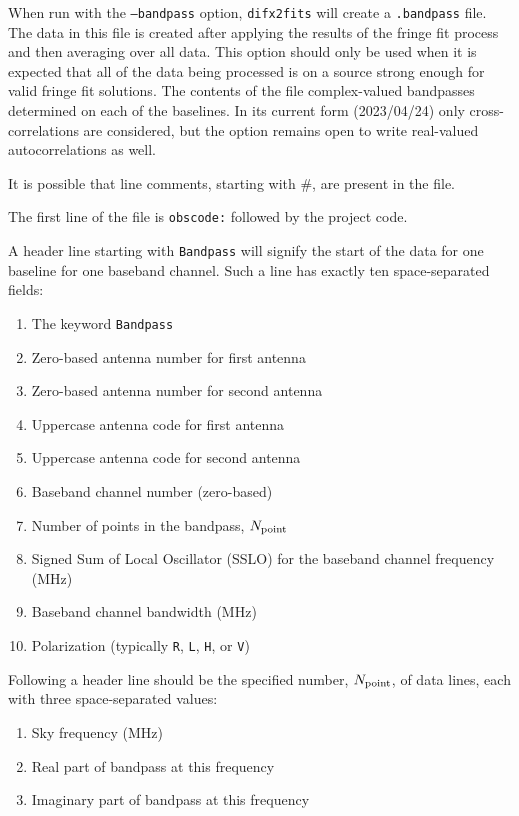 When run with the {\tt --bandpass} option, {\tt difx2fits} will create a {\tt .bandpass} file.
The data in this file is created after applying the results of the fringe fit process and then averaging over all data.
This option should only be used when it is expected that all of the data being processed is on a source strong enough for valid fringe fit solutions.
The contents of the file complex-valued bandpasses determined on each of the baselines.
In its current form (2023/04/24) only cross-correlations are considered, but the option remains open to write real-valued autocorrelations as well.

It is possible that line comments, starting with \#, are present in the file.

The first line of the file is {\tt obscode:} followed by the project code.

A header line starting with {\tt Bandpass} will signify the start of the data for one baseline for one baseband channel.
Such a line has exactly ten space-separated fields:
\begin{enumerate}
  \item The keyword {\tt Bandpass}
  \item Zero-based antenna number for first antenna
  \item Zero-based antenna number for second antenna
  \item Uppercase antenna code for first antenna
  \item Uppercase antenna code for second antenna
  \item Baseband channel number (zero-based)
  \item Number of points in the bandpass, $N_{\rm point}$
  \item Signed Sum of Local Oscillator (SSLO) for the baseband channel frequency (MHz)
  \item Baseband channel bandwidth (MHz)
  \item Polarization (typically {\tt R}, {\tt L}, {\tt H}, or {\tt V})
\end{enumerate}

Following a header line should be the specified number, $N_{\rm point}$, of data lines, each with three space-separated values:
\begin{enumerate}
  \item Sky frequency (MHz)
  \item Real part of bandpass at this frequency
  \item Imaginary part of bandpass at this frequency
\end{enumerate}

